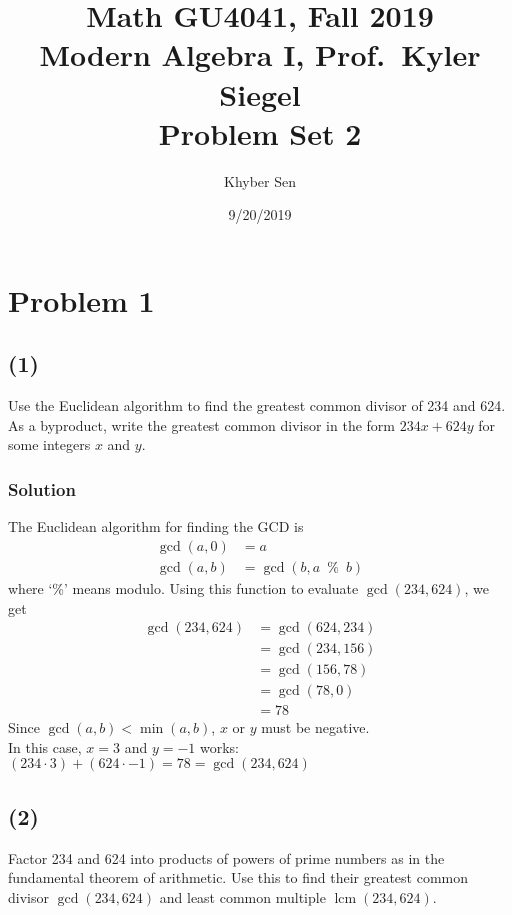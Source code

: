 \documentclass[fleqn]{article}
\title{
Math GU4041, Fall 2019 \\
Modern Algebra I, Prof.\ Kyler Siegel \\
Problem Set 2
}
\author{Khyber Sen}
\date{9/20/2019}
\DeclareMathOperator{\lcm}{lcm}
\begin{document}
    
    \maketitle
    
    \section{Problem 1}
        
        \subsection{(1)}
        Use the Euclidean algorithm to find the greatest common divisor of 234 and 624.  As a byproduct, write the greatest common divisor in the form $234x + 624y$ for some integers $x$ and $y$.
            
            \subsubsection{Solution}
            The Euclidean algorithm for finding the GCD is
            \begin{align}
                \gcd(a, 0) &= a \\
                \gcd(a, b) &= \gcd(b, a \enspace \% \enspace  b)
            \end{align}
            where `\%' means modulo.  Using this function to evaluate $\gcd(234, 624)$, we get
            \begin{align}
                \gcd(234, 624) &= \gcd(624, 234) \\
                &= \gcd(234, 156) \\
                &= \gcd(156, 78) \\
                &= \gcd(78, 0) \\
                &= 78
            \end{align}
            Since $\gcd(a, b) < \min(a, b)$, $x$ or $y$ must be negative. \\
            In this case, $x = 3$ and $y = -1$ works: $(234 \cdot 3) + (624 \cdot -1) = 78 = \gcd(234, 624)$
            
        \subsection{(2)}
        Factor 234 and 624 into products of powers of prime numbers as in the fundamental theorem of arithmetic.  Use this to find their greatest common divisor $\gcd(234, 624)$ and least common multiple $\lcm(234, 624)$.
            
\end{document}
